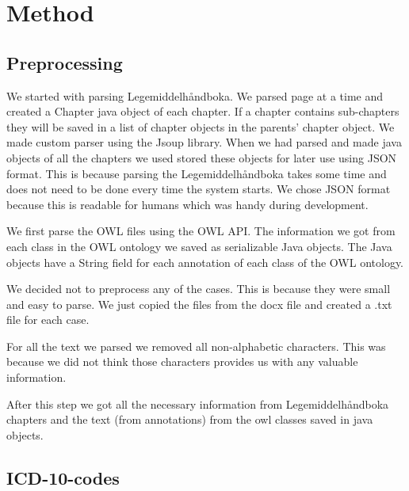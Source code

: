 \chapter{Method}
\label{cha:method}


\section{Preprocessing}
\label{sec:preprocessing}

We started with parsing Legemiddelhåndboka. We parsed page at a time and created
a Chapter java object of each chapter. If a chapter contains sub-chapters they
will be saved in a list of chapter objects in the parents’ chapter object. We
made custom parser using the Jsoup library. When we had parsed and made java
objects of all the chapters we used stored these objects for later use using
JSON format. This is because parsing the Legemiddelhåndboka takes some time and
does not need to be done every time the system starts. We chose JSON format
because this is readable for humans which was handy during development.

We first parse the OWL files using the OWL API. The information we got from each
class in the OWL ontology we saved as serializable Java objects. The Java
objects have a String field for each annotation of each class of the OWL
ontology.

We decided not to preprocess any of the cases. This is because they were small
and easy to parse. We just copied the files from the docx file and created a
.txt file for each case.

For all the text we parsed we removed all non-alphabetic characters. This was
because we did not think those characters provides us with any valuable
information.

After this step we got all the necessary information from Legemiddelhåndboka chapters
and the text (from annotations) from the owl classes saved in java objects.


\section{ICD-10-codes}
\label{sec:}

